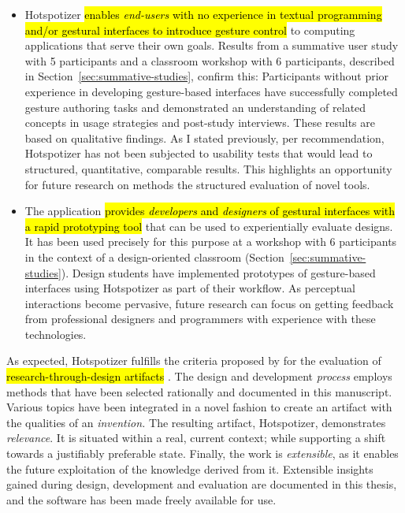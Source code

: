 \begin{itemize}
\item Hotspotizer \hl{enables \emph{end-users} with no experience in textual programming and/or gestural interfaces to introduce gesture control} to computing applications that serve their own goals. Results from a summative user study with 5 participants and a classroom workshop with 6 participants, described in Section~\ref{sec:summative-studies}, confirm this: Participants without prior experience in developing gesture-based interfaces have successfully completed gesture authoring tasks and demonstrated an understanding of related concepts in usage strategies and post-study interviews. These results are based on qualitative findings. As I stated previously, per  recommendation, Hotspotizer has not been subjected to usability tests that would lead to structured, quantitative, comparable results. This highlights an opportunity for future research on methods the structured evaluation of novel tools.
\item The application \hl{provides \emph{developers} and \emph{designers} of gestural interfaces with a rapid prototyping tool} that can be used to experientially evaluate designs. It has been used precisely for this purpose at a workshop with 6 participants in the context of a design-oriented classroom (Section~\ref{sec:summative-studies}). Design students have implemented prototypes of gesture-based interfaces using Hotspotizer as part of their workflow. As perceptual interactions become pervasive, future research can focus on getting feedback from professional designers and programmers with experience with these technologies.
\end{itemize}

As expected, Hotspotizer fulfills the criteria proposed by \textcite{Zimmerman:2007} for the evaluation of \hl{research-through-design artifacts} \parencite{Frayling:1993}. The design and development \emph{process} employs methods that have been selected rationally and documented in this manuscript. Various topics have been integrated in a novel fashion to create an artifact with the qualities of an \emph{invention.} The resulting artifact, Hotspotizer, demonstrates \emph{relevance}. It is situated within a real, current context; while supporting a shift towards a justifiably preferable state. Finally, the work is \emph{extensible}, as it enables the future exploitation of the knowledge derived from it. Extensible insights gained during design, development and evaluation are documented in this thesis, and the software has been made freely available for use.


